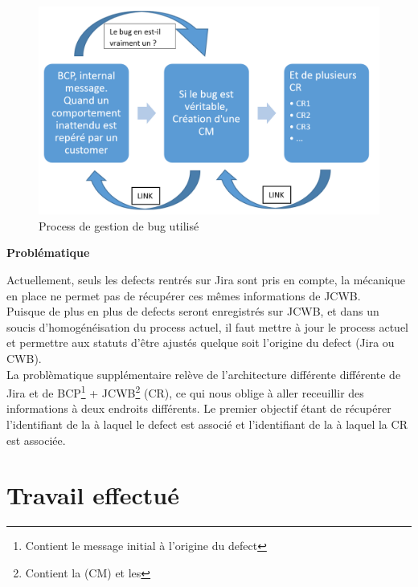 \begin{figure}[h]
  \centering
      \includegraphics[width=\textwidth]{images/bugManagementProcess.png}
  \caption{Process de gestion de bug utilisé}
	\label{figure:bugManagementProcess}
\end{figure}




\textbf{Probl\'{e}matique}\hfill \\ \indent

Actuellement, seuls les defects rentrés sur Jira sont pris en compte, la mécanique en place ne permet pas de récupérer ces mêmes informations de JCWB. \\
Puisque de plus en plus de defects seront enregistrés sur JCWB, et dans un soucis d'homogénéisation du process actuel, il faut mettre à jour le process actuel et permettre aux statuts d'être ajustés quelque soit l'origine du defect (Jira ou CWB).\\
La problèmatique supplémentaire relève de l'architecture différente différente de Jira et de BCP\footnote{Contient le message initial à l'origine du defect} + JCWB\footnote{Contient la  (CM) et les } (CR), ce qui nous oblige à aller receuillir des informations à deux endroits différents. Le premier objectif étant de récupérer l'identifiant de la  à laquel le defect est associé et l'identifiant de la  à laquel la CR est associée.\\






\section{Travail effectu\'{e}}


